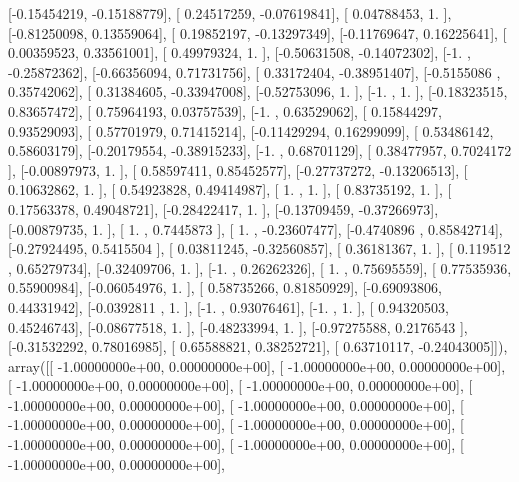 \documentclass{article}
\begin{document}
       [-0.15454219, -0.15188779],
       [ 0.24517259, -0.07619841],
       [ 0.04788453,  1.        ],
       [-0.81250098,  0.13559064],
       [ 0.19852197, -0.13297349],
       [-0.11769647,  0.16225641],
       [ 0.00359523,  0.33561001],
       [ 0.49979324,  1.        ],
       [-0.50631508, -0.14072302],
       [-1.        , -0.25872362],
       [-0.66356094,  0.71731756],
       [ 0.33172404, -0.38951407],
       [-0.5155086 ,  0.35742062],
       [ 0.31384605, -0.33947008],
       [-0.52753096,  1.        ],
       [-1.        ,  1.        ],
       [-0.18323515,  0.83657472],
       [ 0.75964193,  0.03757539],
       [-1.        ,  0.63529062],
       [ 0.15844297,  0.93529093],
       [ 0.57701979,  0.71415214],
       [-0.11429294,  0.16299099],
       [ 0.53486142,  0.58603179],
       [-0.20179554, -0.38915233],
       [-1.        ,  0.68701129],
       [ 0.38477957,  0.7024172 ],
       [-0.00897973,  1.        ],
       [ 0.58597411,  0.85452577],
       [-0.27737272, -0.13206513],
       [ 0.10632862,  1.        ],
       [ 0.54923828,  0.49414987],
       [ 1.        ,  1.        ],
       [ 0.83735192,  1.        ],
       [ 0.17563378,  0.49048721],
       [-0.28422417,  1.        ],
       [-0.13709459, -0.37266973],
       [-0.00879735,  1.        ],
       [ 1.        ,  0.7445873 ],
       [ 1.        , -0.23607477],
       [-0.4740896 ,  0.85842714],
       [-0.27924495,  0.5415504 ],
       [ 0.03811245, -0.32560857],
       [ 0.36181367,  1.        ],
       [ 0.119512  ,  0.65279734],
       [-0.32409706,  1.        ],
       [-1.        ,  0.26262326],
       [ 1.        ,  0.75695559],
       [ 0.77535936,  0.55900984],
       [-0.06054976,  1.        ],
       [ 0.58735266,  0.81850929],
       [-0.69093806,  0.44331942],
       [-0.0392811 ,  1.        ],
       [-1.        ,  0.93076461],
       [-1.        ,  1.        ],
       [ 0.94320503,  0.45246743],
       [-0.08677518,  1.        ],
       [-0.48233994,  1.        ],
       [-0.97275588,  0.2176543 ],
       [-0.31532292,  0.78016985],
       [ 0.65588821,  0.38252721],
       [ 0.63710117, -0.24043005]]), array([[ -1.00000000e+00,   0.00000000e+00],
       [ -1.00000000e+00,   0.00000000e+00],
       [ -1.00000000e+00,   0.00000000e+00],
       [ -1.00000000e+00,   0.00000000e+00],
       [ -1.00000000e+00,   0.00000000e+00],
       [ -1.00000000e+00,   0.00000000e+00],
       [ -1.00000000e+00,   0.00000000e+00],
       [ -1.00000000e+00,   0.00000000e+00],
       [ -1.00000000e+00,   0.00000000e+00],
       [ -1.00000000e+00,   0.00000000e+00],
       [ -1.00000000e+00,   0.00000000e+00],
\end{document}
